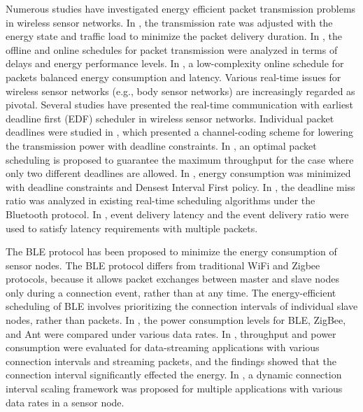 \documentclass[10pt,journal,compsoc]{IEEEtran}
\begin{document}
Numerous studies \cite{yang2012optimal,el2002energy,wu2015efficient} have investigated energy efficient packet transmission problems in wireless sensor networks. In \cite{yang2012optimal}, the transmission rate was adjusted with the energy state and traffic load to minimize the packet delivery duration. In \cite{el2002energy}, the offline and online schedules for packet transmission were analyzed in terms of delays and energy performance levels. In \cite{wu2015efficient}, a low-complexity online schedule for packets balanced energy consumption and latency. Various real-time issues for wireless sensor networks (e.g., body sensor networks) are increasingly regarded as pivotal.
Several studies \cite{aquino2008wireless, zhu2011mbstar} have presented the real-time communication with earliest deadline first (EDF) scheduler in wireless sensor networks. Individual packet deadlines were studied in \cite{uysal2002energy}, which presented a channel-coding scheme for lowering the transmission power with deadline constraints. In \cite{zhang2015nearly}, an optimal packet scheduling is proposed to guarantee the maximum throughput for the case where only two different deadlines are allowed. In \cite{shan2014optimal}, energy consumption was minimized with deadline constraints and Densest Interval First policy. In \cite{collotta2013deadline}, the deadline miss ratio was analyzed in existing real-time scheduling algorithms under the Bluetooth protocol. In \cite{mutilplepkt}, event delivery latency and the event delivery ratio were used to satisfy latency requirements with multiple packets.


The BLE protocol has been proposed to minimize the energy consumption of sensor nodes. The BLE protocol differs from traditional WiFi and Zigbee protocols, because it allows packet exchanges between master and slave nodes only during a connection event, rather than at any time. The energy-efficient scheduling of BLE involves prioritizing the connection intervals of individual slave nodes, rather than packets. In \cite{dementyev2013power}, the power consumption levels for BLE, ZigBee, and Ant were compared under various data rates. In \cite{giovanelli2015bluetooth}, throughput and power consumption were evaluated for data-streaming applications with various connection intervals and streaming packets, and the findings showed that the connection interval significantly effected the energy. In \cite{kindt2015adaptive}, a dynamic connection interval scaling framework was proposed for multiple applications with various data rates in a sensor node.
\end{document}
